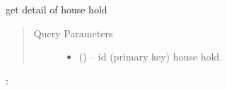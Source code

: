 \documentclass[letterpaper,10pt,english,openany,oneside]{sphinxmanual}
\begin{document}
\begin{fulllineitems}
\label{\detokenize{api-last-mile/v1:get--api-last-smile-v1-fociHouseHold-detail}}
\sphinxAtStartPar
get detail of house hold
\begin{quote}\begin{description}
\item[{Query Parameters}] \leavevmode\begin{itemize}
\item {} 
\sphinxAtStartPar
{} () – id (primary key) house hold.

\end{itemize}

\end{description}\end{quote}

\sphinxAtStartPar
{}:


\end{fulllineitems}
\end{document}
